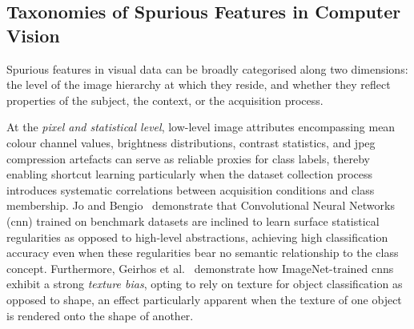 \subsection*{Taxonomies of Spurious Features in Computer Vision}

Spurious features in visual data can be broadly categorised along two dimensions: the level
of the image hierarchy at which they reside, and whether they reflect properties of the
subject, the context, or the acquisition process.


At the \emph{pixel and statistical level}, low-level image attributes encompassing mean
colour channel values, brightness distributions, contrast statistics, and jpeg
compression artefacts can serve as reliable proxies for class labels, thereby enabling
shortcut learning particularly when the dataset collection process introduces systematic
correlations between acquisition conditions and class membership.
Jo and Bengio~\cite{Jo_2017_SurfaceStatisticalRegularities} demonstrate that
Convolutional Neural Networks (\acrshort{cnn}) trained on benchmark datasets are inclined
to learn surface statistical regularities as opposed to high-level abstractions, achieving
high classification accuracy even when these regularities bear no semantic relationship to
the class concept. Furthermore, Geirhos et al.~\cite{Geirhos_2019_TextureBias} demonstrate
how ImageNet-trained \acrshort{cnn}s exhibit a strong \emph{texture bias}, opting to rely
on texture for object classification as opposed to shape, an effect particularly apparent
when the texture of one object is rendered onto the shape of another.

